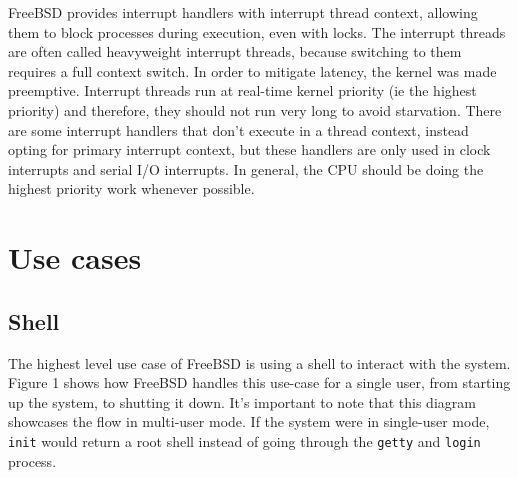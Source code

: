\documentclass[12pt, dvipsnames, a4paper]{article}
\newcommand{\code}[1]{\texttt{#1}}
\begin{document}
FreeBSD provides interrupt handlers with interrupt thread context, allowing them to block processes during execution, even with locks. The interrupt threads are often called heavyweight interrupt threads, because switching to them requires a full context switch. In order to mitigate latency, the kernel was made preemptive. Interrupt threads run at real-time kernel priority (ie the highest priority) and therefore, they should not run very long to avoid starvation. There are some interrupt handlers that don’t execute in a thread context, instead opting for primary interrupt context, but these handlers are only used in clock interrupts and serial I/O interrupts. In general, the CPU should be doing the highest priority work whenever possible.

\clearpage
\section{Use cases}
\subsection{Shell}
The highest level use case of FreeBSD is using a shell to interact with the system.
Figure 1 shows how FreeBSD handles this use-case for a single user,
from starting up the system, to shutting it down. It's important to note that
this diagram showcases the flow in multi-user mode. If the system were in
single-user mode, \code{init} would return a root shell instead of going through the
\code{getty} and \code{login} process\cite{bootprocess}\cite{init}.
\end{document}
